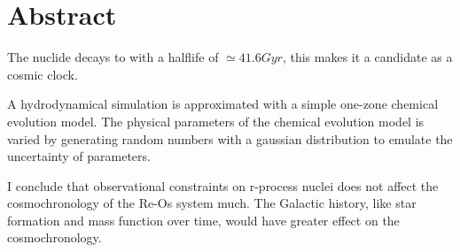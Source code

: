 \section*{Abstract}
The nuclide  decays to  with a halflife of $\simeq41.6 Gyr$, this makes it a candidate as a cosmic clock.

A hydrodynamical simulation is approximated with a simple one-zone chemical evolution model.
The physical parameters of the chemical evolution model is varied by generating random numbers with a gaussian distribution to emulate the uncertainty of parameters.

I conclude that observational constraints on r-process nuclei does not affect the cosmochronology of the Re-Os system much.
The Galactic history, like star formation and mass function over time, would have greater effect on the cosmochronology.
\newpage
